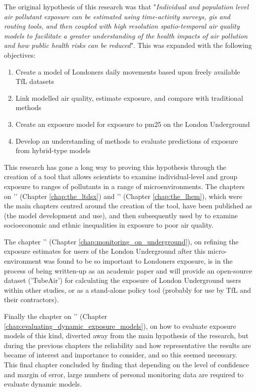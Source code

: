 The original hypothesis of this research was that "\textit{Individual and population level air pollutant exposure can be estimated using time-activity surveys, \gls{gis} and routing tools, and then coupled with high resolution spatio-temporal air quality models to facilitate a greater understanding of the health impacts of air pollution and how public health risks can be reduced}". This was expanded with the following objectives:

\begin{enumerate}
    \item Create a model of Londoners daily movements based upon freely available TfL datasets
    \item Link modelled air quality, estimate exposure, and compare with traditional methods
    \item Create an exposure model for exposure to \gls{pm25} on the London Underground
    \item Develop an understanding of methods to evaluate predictions of exposure from hybrid-type models
\end{enumerate}

This research has gone a long way to proving this hypothesis through the creation of a tool that allows scientists to examine individual-level and group exposure to ranges of pollutants in a range of microenvironments. The chapters on '' (Chapter \ref{chap:the_ltdsx}) and '' (Chapter \ref{chap:the_lhem}), which were the main chapters centred around the creation of the tool, have been published as \cite{Smith2016} (the model development and use), and then subsequently used by \cite{Tonne2018} to examine socioeconomic and ethnic inequalities in exposure to poor air quality.

The chapter '' (Chapter \ref{chap:monitoring_on_underground}), on refining the exposure estimates for users of the London Underground after this micro-environment was found to be so important to Londoners exposure, is in the process of being written-up as an academic paper and will provide an open-source dataset ('TubeAir') for calculating the exposure of London Underground users within other studies, or as a stand-alone policy tool (probably for use by TfL and their contractors).

Finally the chapter on '' (Chapter \ref{chap:evaluating_dynamic_exposure_models}), on how to evaluate exposure models of this kind, diverted away from the main hypothesis of the research, but during the previous chapters the reliability and how representative the results are became of interest and importance to consider, and so this seemed necessary. This final chapter concluded by finding that depending on the level of confidence and margin of error, large numbers of personal monitoring data are required to evaluate dynamic models.

